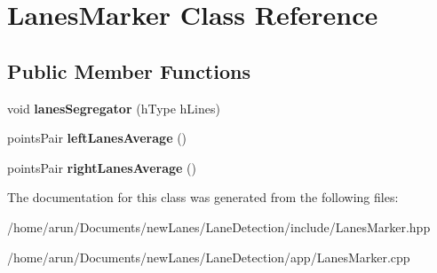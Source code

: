\hypertarget{classLanesMarker}{}\section{Lanes\+Marker Class Reference}
\label{classLanesMarker}
\subsection*{Public Member Functions}
\begin{DoxyCompactItemize}
\item 
void {\bfseries lanes\+Segregator} (h\+Type h\+Lines)\hypertarget{classLanesMarker_ae077bd447618d8ddcf67ced3bca12b15}{}\label{classLanesMarker_ae077bd447618d8ddcf67ced3bca12b15}

\item 
points\+Pair {\bfseries left\+Lanes\+Average} ()\hypertarget{classLanesMarker_ad60e1e41f33ed52fe349fabe2c26ad53}{}\label{classLanesMarker_ad60e1e41f33ed52fe349fabe2c26ad53}

\item 
points\+Pair {\bfseries right\+Lanes\+Average} ()\hypertarget{classLanesMarker_a3490c946ef4e75917f752e71da83f8ca}{}\label{classLanesMarker_a3490c946ef4e75917f752e71da83f8ca}

\end{DoxyCompactItemize}


The documentation for this class was generated from the following files\+:\begin{DoxyCompactItemize}
\item 
/home/arun/\+Documents/new\+Lanes/\+Lane\+Detection/include/Lanes\+Marker.\+hpp\item 
/home/arun/\+Documents/new\+Lanes/\+Lane\+Detection/app/Lanes\+Marker.\+cpp\end{DoxyCompactItemize}
